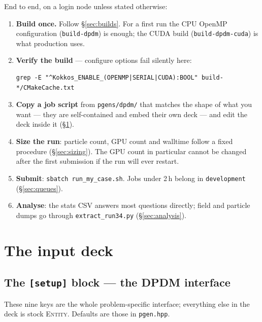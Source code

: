 \documentclass[11pt,a4paper]{article}
\newcommand{\code}[1]{\texttt{\small #1}}
\begin{document}
End to end, on a login node unless stated otherwise:

\begin{enumerate}
  \item \textbf{Build once.} Follow \S\ref{sec:builds}. For a first run the CPU
        OpenMP configuration (\code{build-dpdm}) is enough; the CUDA build
        (\code{build-dpdm-cuda}) is what production uses.
  \item \textbf{Verify the build} --- configure options fail silently here:
        \begin{lstlisting}
grep -E "^Kokkos_ENABLE_(OPENMP|SERIAL|CUDA):BOOL" build-*/CMakeCache.txt
        \end{lstlisting}
  \item \textbf{Copy a job script} from \code{pgens/dpdm/} that matches the shape of
        what you want --- they are self-contained and embed their own deck --- and edit
        the deck inside it (\S\ref{sec:deck}).
  \item \textbf{Size the run}: particle count, GPU count and walltime follow a fixed
        procedure (\S\ref{sec:sizing}). The GPU count in particular cannot be changed
        after the first submission if the run will ever restart.
  \item \textbf{Submit}: \code{sbatch run\_my\_case.sh}. Jobs under 2\,h belong in
        \code{development} (\S\ref{sec:queues}).
  \item \textbf{Analyse}: the stats CSV answers most questions directly; field and
        particle dumps go through \code{extract\_run34.py}
        (\S\ref{sec:analysis}).
\end{enumerate}

\section{The input deck}
\label{sec:deck}

\subsection{The \code{[setup]} block --- the DPDM interface}

These nine keys are the whole problem-specific interface; everything else in the deck
is stock \textsc{Entity}. Defaults are those in \code{pgen.hpp}.
\end{document}
